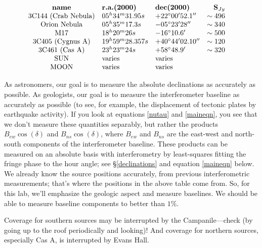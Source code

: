 \documentclass[11pt,preprint]{aastex}
\begin{document}
$$\vbox{\halign{ \hfil#\hfil\ \ & #\hfil\ \ & #\hfil\ \ &    
\hfil#\ \ \ \cr

{\bf name} & {\bf r.a.(2000)} & {\bf dec(2000)} & {\bf S$_{Jy}$} \cr

3C144 (Crab Nebula) & $05^h 34^m 31.95s$ &$+22^\circ 00' 52.1''$ & $\sim 496$ \cr
Orion Nebula        & $05^h 35^m 17.3s$ & $-05^\circ 23' 28''$ & $\sim 340$ \cr
M17                 & $18^h 20^m 26s$ & $-16^\circ 10.6'$ & $\sim 500$ \cr
3C405 (Cygnus A)    & $19^h 59^m 28.357s$ & $+40^\circ 44' 02.10''$ & $\sim 120$ \cr  
3C461 (Cas A)       & $23^h 23^m 24s$ & $+58^\circ 48.9'$ & $\sim 320$ \cr 
SUN                 &   varies       &   varies \cr
MOON                &   varies       &   varies \cr
}}$$

As astronomers, our goal is to measure the absolute declinations as
accurately as possible. As geologists, our goal is to measure the
interferometer baseline as accurately as possible (to see, for example,
the displacement of tectonic plates by earthquake activity). If you look
at equations \ref{nutau} and \ref{maineqn}, you see that we don't
measure these quantities separably, but rather the products $B_{ew}
\cos(\delta)$ and $B_{ns} \cos(\delta)$, where $B_{ew}$ and $B_{ns}$ are
the east-west and north-south components of the interferometer
baseline. These products can be measured on an absolute basis with
interferometry by least-squares fitting the fringe phase to the hour
angle; see \S\ref{declinations} and equation \ref{maineqn} below.  We
already know the source positions accurately, from previous
interferometric measurements; that's where the positions in the above
table come from. So, for this lab, we'll emphasize the geologic aspect
and measure baselines. We should be able to measure baseline components
to better than $1\%$.

Coverage for southern sources may be interrupted by the
Campanile---check (by going up to the roof periodically and looking)!
And coverage for northern sources, especially Cas A, is interrupted by
Evans Hall.
\end{document}
